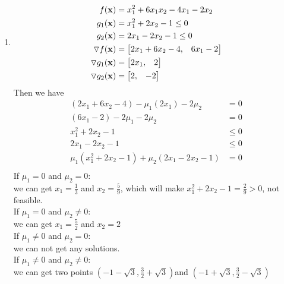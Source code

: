 \documentclass{article}
\begin{document}
\begin{enumerate} [label=(\alph*)]
\item 
\begin{align*} 
f(\boldsymbol{\mathrm{x}}) & = x_1^2 +6x_1x_2 -4x_1 -2x_2\\
g_1(\boldsymbol{\mathrm{x}}) & = x_1^2 + 2x_2 - 1 \leq 0 \\
g_2(\boldsymbol{\mathrm{x}}) & = 2x_1 -2x_2 - 1 \leq 0 \\
\triangledown f(\boldsymbol{\mathrm{x}}) &= \begin{bmatrix} 2x_1+6x_2-4, & 6x_1 -2 \end{bmatrix} \\
\triangledown g_1(\boldsymbol{\mathrm{x}}) &= \begin{bmatrix} 2x_1, &2   \end{bmatrix} \\
\triangledown g_2(\boldsymbol{\mathrm{x}}) &= \begin{bmatrix} 2, &-2 \end{bmatrix}  \\
\end{align*} 
Then we have \begin{align*} 
(2x_1 + 6x_2 -4) -\mu_1(2x_1) -2\mu_2 & = 0 \\
(6x_1-2) -2\mu_1 -2\mu_2 &= 0 \\
x_1^2 +2x_2-1 &\leq 0 \\
2x_1-2x_2-1 &\leq 0 \\
\mu_1(x_1^2 +2x_2 -1) + \mu_2 (2x_1-2x_2-1 ) &= 0 \\
\end{align*} 
If $\mu_1 = 0 $ and $\mu_2 = 0 $:  \\ we can get $x_1=\frac{1}{3} $ and $x_2 = \frac{5}{9} $, which will make $x_1^2+2x_2-1 = \frac{2}{9} > 0  $, not feasible. \\
If $\mu_1 = 0 $ and $\mu_2 \neq 0 $:  \\ we can get $ x_1 = \frac{5}{2} $ and $x_2 = 2 $ \\ 
If $\mu_1 \neq 0 $ and $\mu_2 =0 $: \\ we can not get any solutions. \\
If $\mu_1 \neq 0 $ and $\mu_2 \neq 0 $: \\ we can get two points $(-1-\sqrt{3}, \frac{3}{2} + \sqrt{3} ) $and $(-1+\sqrt{3}, \frac{3}{2} -\sqrt{3}) $ \\ 




\end{enumerate} 
\end{document}
